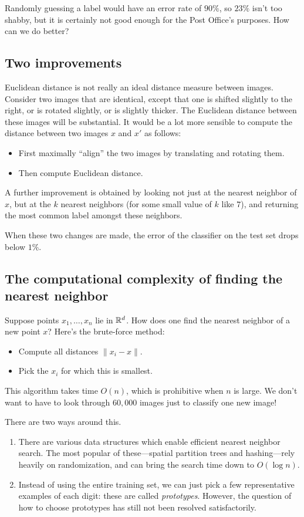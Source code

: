 Randomly guessing a label would have an error rate of $90\%$, so $23\%$ isn't 
too shabby, but it is certainly not good enough for the Post Office's purposes. 
How can we do better?

\subsection{Two improvements}

Euclidean distance is not really an ideal distance measure between images.
Consider two images that are identical, except that one is shifted slightly
to the right, or is rotated slightly, or is slightly thicker. The Euclidean
distance between these images will be substantial. It would be a lot more
sensible to compute the distance between two images $x$ and $x'$ as follows:
\begin{itemize}
\item First maximally ``align'' the two images by translating and rotating them.
\item Then compute Euclidean distance.
\end{itemize}

A further improvement is obtained by looking not just at the nearest neighbor
of $x$, but at the $k$ nearest neighbors (for some small value of $k$ like $7$),
and returning the most common label amongst these neighbors.

When these two changes are made, the error of the classifier on the test set 
drops below $1\%$.

\subsection{The computational complexity of finding the nearest neighbor}

Suppose points $x_1, \ldots, x_n$ lie in $\mathbb{R}^d$. How does one find the nearest
neighbor of a new point $x$? Here's the brute-force method:
\begin{itemize}
\item Compute all distances $\|x_i - x\|$.
\item Pick the $x_i$ for which this is smallest.
\end{itemize}
This algorithm takes time $O(n)$, which is prohibitive when $n$ is large.
We don't want to have to look through $60{,}000$ images just to classify
one new image!

There are two ways around this.
\begin{enumerate}
\item There are various data structures which enable efficient nearest neighbor search.
The most popular of these---spatial partition trees and hashing---rely heavily
on randomization, and can bring the search time down to $O(\log n)$.
\item Instead of using the entire training set, we can just pick a few representative
examples of each digit: these are called {\it prototypes}. However, the question of 
how to choose prototypes has still not been resolved satisfactorily.
\end{enumerate}

